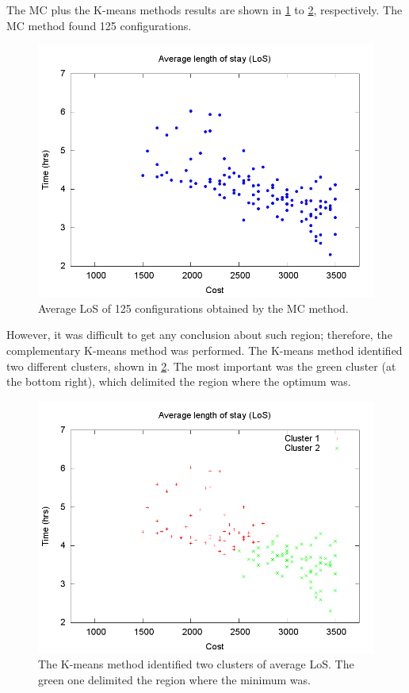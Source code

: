 The MC plus the K-means methods results are shown in \ref{subfig:mc17-1}
to \ref{subfig:km17-1}, respectively. The MC method found 125 configurations.
\begin{figure}[H]
\noindent \centering{}\includegraphics[width=0.95\columnwidth,height=0.25\paperheight]{figs4/v0/MC/MC-6400-602-100-69-25-125confs-LoS}\caption{Average LoS of 125 configurations obtained by the MC method. \label{subfig:mc17-1}}
\end{figure}
 However, it was difficult to get any conclusion about such region;
therefore, the complementary K-means method was performed. The K-means
method identified two different clusters, shown in \ref{subfig:km17-1}.
The most important was the green cluster (at the bottom right), which
delimited the region where the optimum was.
\begin{figure}[H]
\noindent \centering{}\includegraphics[width=0.95\columnwidth,height=0.25\paperheight]{figs4/v0/MC/K-means-6400-602-100-69-25-125-Cluster1-49_Cluster2-68}\caption{The K-means method identified two clusters of average LoS. The green
one delimited the region where the minimum was.\label{subfig:km17-1}}
\end{figure}


